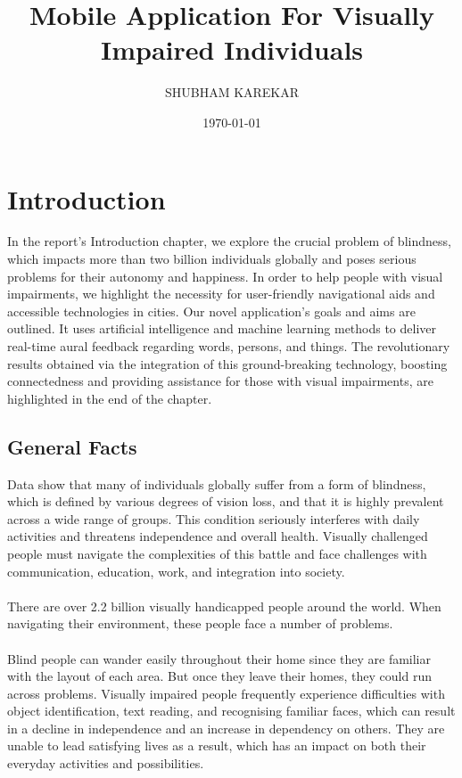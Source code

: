 \documentclass[MScCS]{uccthesis}
\title{Mobile Application For Visually Impaired Individuals}
\author{SHUBHAM KAREKAR}
\date{\today}
\begin{document}
   \chapter{Introduction}
   In the report's Introduction chapter, we explore the crucial problem of blindness, which impacts more than two billion individuals globally and poses serious problems for their autonomy and happiness. In order to help people with visual impairments, we highlight the necessity for user-friendly navigational aids and accessible technologies in cities. Our novel application's goals and aims are outlined. It uses artificial intelligence and machine learning methods to deliver real-time aural feedback regarding words, persons, and things. The revolutionary results obtained via the integration of this ground-breaking technology, boosting connectedness and providing assistance for those with visual impairments, are highlighted in the end of the chapter.

   \section{General Facts}
  Data show that many of individuals globally suffer from a form of blindness, which is defined by various degrees of vision loss, and that it is highly prevalent across a wide range of groups. This condition seriously interferes with daily activities and threatens independence and overall health. Visually challenged people must navigate the complexities of this battle and face challenges with communication, education, work, and integration into society. \\
   \\
   There are over 2.2 billion visually handicapped people around the world. When navigating their environment, these people face a number of problems.\\
    \\
    Blind people can wander easily throughout their home since they are familiar with the layout of each area. But once they leave their homes, they could run across problems. Visually impaired people frequently experience difficulties with object identification, text reading, and recognising familiar faces, which can result in a decline in independence and an increase in dependency on others. They are unable to lead satisfying lives as a result, which has an impact on both their everyday activities and possibilities.
\end{document}
